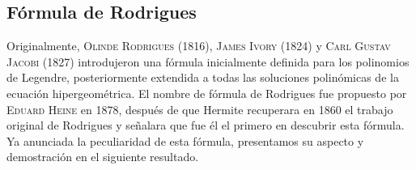 \subsection{Fórmula de Rodrigues}
\label{subsection:Rodrigues}

Originalmente, \textsc{Olinde Rodrigues} (1816), \textsc{James Ivory} (1824) y \textsc{Carl Gustav Jacobi} (1827) introdujeron una fórmula inicialmente definida para los polinomios de Legendre, posteriormente extendida a todas las soluciones polinómicas de la ecuación hipergeométrica. El nombre de fórmula de Rodrigues fue propuesto por \textsc{Eduard Heine} en 1878, después de que Hermite recuperara en 1860 el trabajo original de Rodrigues y señalara que fue él el primero en descubrir esta fórmula. Ya anunciada la peculiaridad de esta fórmula, presentamos su aspecto y demostración en el siguiente resultado.

